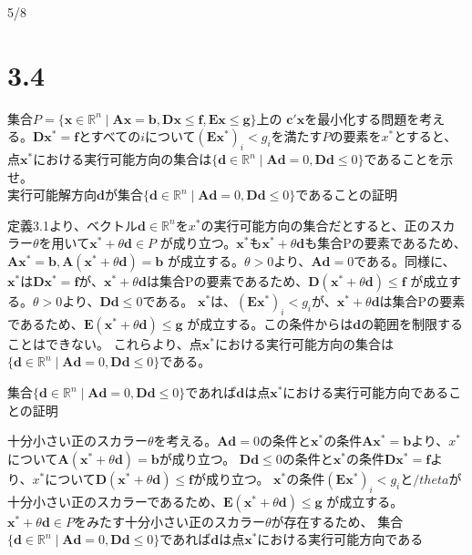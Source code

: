 \documentclass{jsarticle}
\begin{document}
5/8

\section*{3.4}
集合$P=\{\bm{x}\in \mathbb{R}^n\mid \bm{Ax}=\bm{b},\bm{Dx}\leq \bm{f},\bm{Ex}\leq \bm{g}\}$上の
$\bm{c}'\bm{x}$を最小化する問題を考える。$\bm{D}\bm{x}^*=\bm{f}$とすべての$i$について$(\bm{E}\bm{x}^*)_i<g_i$を満たす$P$の要素を$x^*$とすると、
点$\bm{x}^*$における実行可能方向の集合は$\{\bm{d}\in \mathbb{R}^n\mid \bm{Ad}=0,\bm{Dd}\leq 0\}$であることを示せ。
 \\

実行可能解方向$\bm{d}$が集合$\{\bm{d}\in \mathbb{R}^n\mid \bm{Ad}=0,\bm{Dd}\leq 0\}$であることの証明\par
定義3.1より、ベクトル$\bm{d}\in \mathbb{R}^n$を$x^*$の実行可能方向の集合だとすると、正のスカラー$\theta$を用いて$\bm{x}^*+\theta \bm{d}\in P$
が成り立つ。$\bm{x}^*$も$\bm{x}^*+\theta \bm{d}$も集合Pの要素であるため、$\bm{A}\bm{x}^*=\bm{b},\bm{A}(\bm{x}^*+\theta \bm{d})=\bm{b}$
が成立する。$\theta > 0$より、$\bm{Ad}=0$である。同様に、
$\bm{x}^*$は$\bm{D}\bm{x}^*= \bm{f}$が、$\bm{x}^*+\theta \bm{d}$は集合Pの要素であるため、$\bm{D}(\bm{x}^*+\theta \bm{d})\leq \bm{f}$
が成立する。$\theta > 0$より、$\bm{Dd}\leq 0$である。
$\bm{x}^*$は、$(\bm{E}\bm{x}^*)_i<g_i$が、$\bm{x}^*+\theta \bm{d}$は集合Pの要素であるため、$\bm{E}(\bm{x}^*+\theta \bm{d})\leq \bm{g}$
が成立する。この条件からは$\bm{d}$の範囲を制限することはできない。
これらより、点$\bm{x}^*$における実行可能方向の集合は$\{\bm{d}\in \mathbb{R}^n\mid \bm{Ad}=0,\bm{Dd}\leq 0\}$である。\par

集合$\{\bm{d}\in \mathbb{R}^n\mid \bm{Ad}=0,\bm{Dd}\leq 0\}$であれば$\bm{d}$は点$\bm{x}^*$における実行可能方向であることの証明\par
十分小さい正のスカラー$\theta $を考える。$\bm{Ad}=0$の条件と$\bm{x}^*$の条件$\bm{A}\bm{x}^*=\bm{b}$より、$x^*$について$\bm{A}(\bm{x}^*+\theta \bm{d})=\bm{b}$が成り立つ。
$\bm{Dd}\leq 0$の条件と$\bm{x}^*$の条件$\bm{D}\bm{x}^*=\bm{f}$より、$x^*$について$\bm{D}(\bm{x}^*+\theta \bm{d})\leq \bm{f}$が成り立つ。
$\bm{x}^*$の条件$(\bm{E}\bm{x}^*)_i<g_i$と$/theta$が十分小さい正のスカラーであるため、$\bm{E}(\bm{x}^*+\theta \bm{d})\leq \bm{g}$
が成立する。$\bm{x}^*+\theta \bm{d}\in P$をみたす十分小さい正のスカラー$\theta$が存在するため、
集合$\{\bm{d}\in \mathbb{R}^n\mid \bm{Ad}=0,\bm{Dd}\leq 0\}$であれば$\bm{d}$は点$\bm{x}^*$における実行可能方向である
\end{document}
